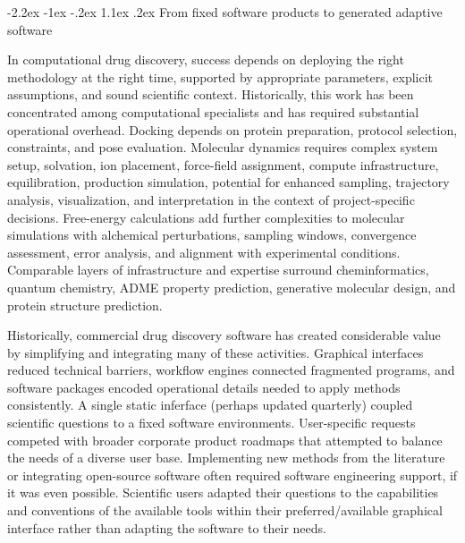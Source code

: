 \documentclass[11pt]{article}
\makeatletter
\renewcommand\section{\@startsection{section}{1}{\z@}%
  {-2.2ex \@plus -1ex \@minus -.2ex}%
  {1.1ex \@plus .2ex}%
  {\normalfont\Large\bfseries\color{molblue}}}
\makeatother
\begin{document}
\section{From fixed software products to generated adaptive software}

In computational drug discovery, success depends on deploying the right methodology at the right time, supported by appropriate parameters, explicit assumptions, and sound scientific context. Historically, this work has been concentrated among computational specialists and has required substantial operational overhead. Docking depends on protein preparation, protocol selection, constraints, and pose evaluation. Molecular dynamics requires complex system setup, solvation, ion placement, force-field assignment, compute infrastructure, equilibration, production simulation, potential for enhanced sampling, trajectory analysis, visualization, and interpretation in the context of project-specific decisions. Free-energy calculations add further complexities to  molecular simulations with alchemical perturbations, sampling windows, convergence assessment, error analysis, and alignment with experimental conditions. Comparable layers of infrastructure and expertise surround cheminformatics, quantum chemistry, ADME property prediction, generative molecular design, and protein structure prediction.

Historically, commercial drug discovery software has created considerable value by simplifying and integrating many of these activities. Graphical interfaces reduced technical barriers, workflow engines connected fragmented programs, and software packages encoded operational details needed to apply methods consistently. A single static inferface (perhaps updated quarterly) coupled scientific questions to a fixed software environments. User-specific requests competed with broader corporate product roadmaps that attempted to balance the needs of a diverse user base. Implementing new methods from the literature or integrating open-source software often required software engineering support, if it was even possible. Scientific users adapted their questions to the capabilities and conventions of the available tools within their preferred/available graphical interface rather than adapting the software to their needs.
\end{document}

